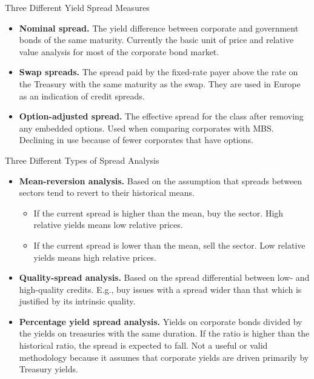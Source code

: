 \documentclass[../custom]{flashcards}
\begin{document}
\begin{flashcard}{Three Different Yield Spread Measures}
    \begin{itemize}
        \item \textbf{Nominal spread.} The yield difference between corporate and government bonds of the same maturity. Currently the basic unit of price and relative value analysis for most of the corporate bond market.
        \item \textbf{Swap spreads.} The spread paid by the fixed-rate payer above the rate on the Treasury with the same maturity as the swap. They are used in Europe as an indication of credit spreads.
        \item \textbf{Option-adjusted spread.} The effective spread for the class after removing any embedded options. Used when comparing corporates with MBS. Declining in use because of fewer corporates that have options.
    \end{itemize}
\end{flashcard}

\begin{flashcard}{Three Different Types of Spread Analysis}
    \begin{itemize}
        \item \textbf{Mean-reversion analysis.} Based on the assumption that spreads between sectors tend to revert to their historical means.
            \begin{itemize}
                \item If the current spread is higher than the mean, buy the sector. High relative yields means low relative prices.
                \item If the current spread is lower than the mean, sell the sector. Low relative yields means high relative prices.
            \end{itemize}
        \item \textbf{Quality-spread analysis.} Based on the spread differential between low- and high-quality credits. E.g., buy issues with a spread wider than that which is justified by its intrinsic quality.
        \item \textbf{Percentage yield spread analysis.} Yields on corporate bonds divided by the yields on treasuries with the same duration. If the ratio is higher than the historical ratio, the spread is expected to fall. Not a useful or valid methodology because it assumes that corporate yields are driven primarily by Treasury yields.
    \end{itemize}
\end{flashcard}
\end{document}
